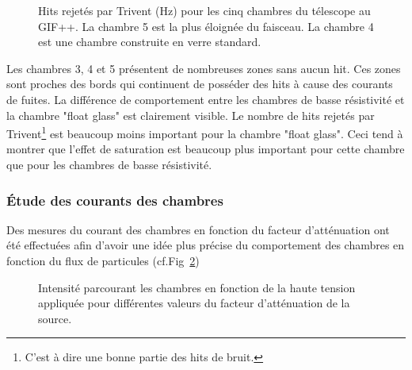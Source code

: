 \begin{figure}[ht!]
	\caption{Hits rejetés par Trivent (\si{\hertz}) pour les cinq chambres du télescope au GIF++. La chambre \num{5} est la plus éloignée du faisceau. La chambre \num{4} est une chambre construite en verre standard.}
	\label{struc}
\end{figure}

Les chambres \num{3}, \num{4} et \num{5} présentent de nombreuses zones sans aucun hit. Ces zones sont proches des bords qui continuent de posséder des hits à cause des courants de fuites. La différence de comportement entre les chambres de basse résistivité et la chambre "float glass" est clairement visible. Le nombre de hits rejetés par Trivent\footnote{C'est à dire une bonne partie des hits de bruit.} est beaucoup moins important pour la chambre "float glass". Ceci tend à montrer que l'effet de saturation est beaucoup plus important pour cette chambre que pour les chambres de basse résistivité.

\subsubsection{Étude des courants des chambres}
Des mesures du courant des chambres en fonction du facteur d'atténuation ont été effectuées afin d'avoir une idée plus précise du comportement des chambres en fonction du flux de particules (cf.Fig~\ref{courant})

\begin{figure}[ht!]
	\centering
	\hfill
	\caption{Intensité parcourant les chambres en fonction de la haute tension appliquée pour différentes valeurs du facteur d'atténuation de la source.}
	\label{courant}
\end{figure}


